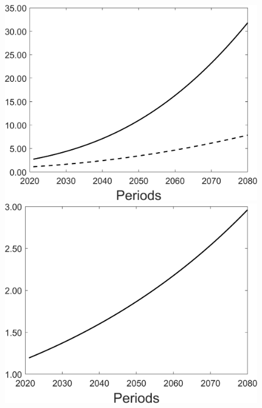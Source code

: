 \begin{figure}[h!!]
\begin{minipage}[]{0.32\textwidth}
	\end{minipage}
	\begin{minipage}[]{0.32\textwidth}
		\includegraphics[width=1\textwidth]{../../codding_model/Own/figures/Rep_agent/staticRam_LF_separate_xc_periods59_eppsilon0.40_zeta1.40_Ad08_Ac04_thetac0.70_thetad0.56_HetGrowth1_tauul0.181_util0_withtarget0_lgd0.png}
	\end{minipage}
\begin{minipage}[]{0.32\textwidth}
\includegraphics[width=1\textwidth]{../../codding_model/Own/figures/Rep_agent/staticRam_LF_separate_ydyc_periods59_eppsilon0.40_zeta1.40_Ad08_Ac04_thetac0.70_thetad0.56_HetGrowth1_tauul0.181_util0_withtarget0_lgd0.png}

\end{minipage}
\end{figure}

